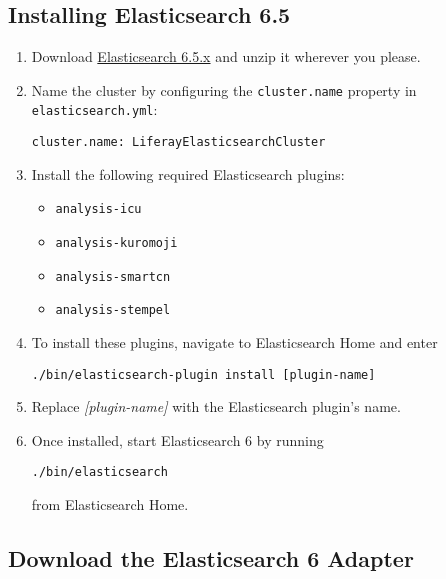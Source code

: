 \noindent\hrulefill

\subsection{Installing Elasticsearch
6.5}\label{installing-elasticsearch-6.5}

\begin{enumerate}
\def\labelenumi{\arabic{enumi}.}
\item
  Download
  \href{https://www.elastic.co/downloads/past-releases}{Elasticsearch
  6.5.x} and unzip it wherever you please.
\item
  Name the cluster by configuring the \texttt{cluster.name} property in
  \texttt{elasticsearch.yml}:

\begin{verbatim}
cluster.name: LiferayElasticsearchCluster
\end{verbatim}
\item
  Install the following required Elasticsearch plugins:

  \begin{itemize}
  \tightlist
  \item
    \texttt{analysis-icu}
  \item
    \texttt{analysis-kuromoji}
  \item
    \texttt{analysis-smartcn}
  \item
    \texttt{analysis-stempel}
  \end{itemize}
\item
  To install these plugins, navigate to Elasticsearch Home and enter

\begin{verbatim}
./bin/elasticsearch-plugin install [plugin-name]
\end{verbatim}
\item
  Replace \emph{{[}plugin-name{]}} with the Elasticsearch plugin's name.
\item
  Once installed, start Elasticsearch 6 by running

\begin{verbatim}
./bin/elasticsearch
\end{verbatim}

  from Elasticsearch Home.
\end{enumerate}

\subsection{Download the Elasticsearch 6
Adapter}\label{download-the-elasticsearch-6-adapter}


